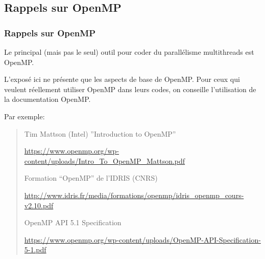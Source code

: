 \documentclass{beamer}
\begin{document}
%
%
%
%
%

\begin{frame}[fragile]
	\section{Rappels sur OpenMP}
	\frametitle{Rappels sur OpenMP}
	\vfill
	Le principal (mais pas le seul) outil pour coder du parallélisme multithreads est OpenMP.

    \vfill
    L'exposé ici ne présente que les aspects de base de OpenMP.
    Pour ceux qui veulent réellement utiliser OpenMP dans leurs codes, on conseille l'utilisation de la documentation OpenMP.

\vfill    
    Par exemple:

{\small    
    \begin{quote}
Tim Mattson (Intel) ''Introduction to OpenMP'' 

\url{https://www.openmp.org/wp-content/uploads/Intro_To_OpenMP_Mattson.pdf}

Formation ``OpenMP'' de l'IDRIS (CNRS)

\url{http://www.idris.fr/media/formations/openmp/idris_openmp_cours-v2.10.pdf}

OpenMP API 5.1 Specification 

\url{https://www.openmp.org/wp-content/uploads/OpenMP-API-Specification-5-1.pdf}
\end{quote}
}
     \vfill
\end{frame}
\end{document}
